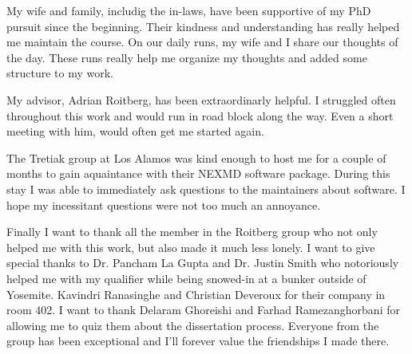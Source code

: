 My wife and family, includig the in-laws, have been supportive of my PhD pursuit since the beginning.
Their kindness and understanding has really helped me maintain the course.
On our daily runs, my wife and I share our thoughts of the day.
These runs really help me organize my thoughts and added some structure to my work.

My advisor, Adrian Roitberg, has been extraordinarly helpful.
I struggled often throughout this work and would run in road block along the way.
Even a short meeting with him, would often get me started again.

The Tretiak group at Los Alamos was kind enough to host me for a couple of months to gain aquaintance with their NEXMD software package.
During this stay I was able to immediately ask questions to the maintainers about software.
I hope my incessitant questions were not too much an annoyance.

Finally I want to thank all the member in the Roitberg group who not only helped me with this work, but also made it much less lonely.
I want to give special thanks to Dr. Pancham La Gupta and Dr. Justin Smith who notoriously helped me with my qualifier while being snowed-in at a bunker outside of Yosemite.
Kavindri Ranasinghe and Christian Deveroux for their company in room 402. 
I want to thank Delaram Ghoreishi and Farhad Ramezanghorbani for allowing me to quiz them about the dissertation process.
Everyone from the group has been exceptional and I'll forever value the friendships I made there.
